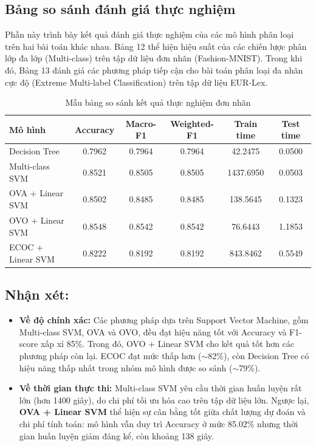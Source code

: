 \subsection{Bảng so sánh đánh giá thực nghiệm}
Phần này trình bày kết quả đánh giá thực nghiệm của các mô hình phân loại trên hai bài toán khác nhau. Bảng 12 thể hiện hiệu suất của các chiến lược phân lớp đa lớp (Multi-class) trên tập dữ liệu đơn nhãn (Fashion-MNIST). Trong khi đó, Bảng 13 đánh giá các phương pháp tiếp cận cho bài toán phân loại đa nhãn cực độ (Extreme Multi-label Classification) trên tập dữ liệu EUR-Lex.
\begin{table}[H]
\centering
\caption{Mẫu bảng so sánh kết quả thực nghiệm đơn nhãn}
\scriptsize
\begin{tabular}{p{3cm}ccccc}
\toprule
\textbf{Mô hình} & \textbf{Accuracy} & \textbf{Macro-F1} & \textbf{Weighted-F1} & \textbf{Train time} & \textbf{Test time} \\
\midrule
Decision Tree & 0.7962  & 0.7964 & 0.7964 & 42.2475 & 0.0500 \\
Multi-class SVM & 0.8521& 0.8505 & 0.8505 & 1437.6950  &  0.0503 \\
OVA + Linear SVM & 0.8502 & 0.8485 & 0.8485 & 138.5645 & 0.1323 \\
OVO + Linear SVM & 0.8548 & 0.8542 & 0.8542 & 76.6443 & 1.1853 \\
ECOC + Linear SVM & 0.8222 & 0.8192 & 0.8192 & 843.8462 & 0.5549 \\
\bottomrule
\end{tabular}
\end{table}

\subsection*{Nhận xét:}
\begin{itemize}
    \item \textbf{Về độ chính xác:} Các phương pháp dựa trên Support Vector Machine, gồm Multi-class SVM, OVA và OVO, đều đạt hiệu năng tốt với Accuracy và F1-score xấp xỉ 85\%. Trong đó, OVO + Linear SVM cho kết quả tốt hơn các phương pháp còn lại. ECOC đạt mức thấp hơn ($\sim$82\%), còn Decision Tree có hiệu năng thấp nhất trong nhóm mô hình được so sánh ($\sim$79\%).
    \item \textbf{Về thời gian thực thi:} Multi-class SVM yêu cầu thời gian huấn luyện rất lớn (hơn 1400 giây), do chi phí tối ưu hóa cao trên tập dữ liệu lớn. Ngược lại, \textbf{OVA + Linear SVM} thể hiện sự cân bằng tốt giữa chất lượng dự đoán và chi phí tính toán: mô hình vẫn duy trì Accuracy ở mức 85.02\% nhưng thời gian huấn luyện giảm đáng kể, còn khoảng 138 giây.
\end{itemize}

